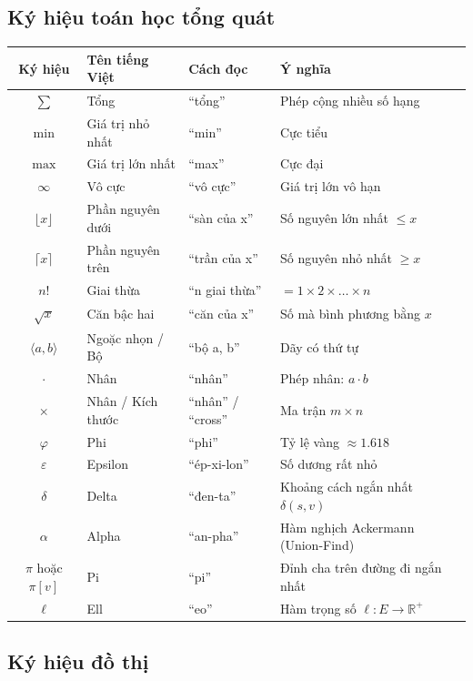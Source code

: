 \documentclass[10pt]{article}
\begin{document}
\subsection{Ký hiệu toán học tổng quát}

\begin{center}
\begin{tabular}{|c|l|l|l|}
\hline
\textbf{Ký hiệu} & \textbf{Tên tiếng Việt} & \textbf{Cách đọc} & \textbf{Ý nghĩa} \\
\hline
$\sum$ & Tổng & ``tổng'' & Phép cộng nhiều số hạng \\
\hline
$\min$ & Giá trị nhỏ nhất & ``min'' & Cực tiểu \\
\hline
$\max$ & Giá trị lớn nhất & ``max'' & Cực đại \\
\hline
$\infty$ & Vô cực & ``vô cực'' & Giá trị lớn vô hạn \\
\hline
$\lfloor x \rfloor$ & Phần nguyên dưới & ``sàn của x'' & Số nguyên lớn nhất $\leq x$ \\
\hline
$\lceil x \rceil$ & Phần nguyên trên & ``trần của x'' & Số nguyên nhỏ nhất $\geq x$ \\
\hline
$n!$ & Giai thừa & ``n giai thừa'' & $= 1 \times 2 \times \ldots \times n$ \\
\hline
$\sqrt{x}$ & Căn bậc hai & ``căn của x'' & Số mà bình phương bằng $x$ \\
\hline
$\langle a, b \rangle$ & Ngoặc nhọn / Bộ & ``bộ a, b'' & Dãy có thứ tự \\
\hline
$\cdot$ & Nhân & ``nhân'' & Phép nhân: $a \cdot b$ \\
\hline
$\times$ & Nhân / Kích thước & ``nhân'' / ``cross'' & Ma trận $m \times n$ \\
\hline
$\varphi$ & Phi & ``phi'' & Tỷ lệ vàng $\approx 1.618$ \\
\hline
$\varepsilon$ & Epsilon & ``ép-xi-lon'' & Số dương rất nhỏ \\
\hline
$\delta$ & Delta & ``đen-ta'' & Khoảng cách ngắn nhất $\delta(s,v)$ \\
\hline
$\alpha$ & Alpha & ``an-pha'' & Hàm nghịch Ackermann (Union-Find) \\
\hline
$\pi$ hoặc $\pi[v]$ & Pi & ``pi'' & Đỉnh cha trên đường đi ngắn nhất \\
\hline
$\ell$ & Ell & ``eo'' & Hàm trọng số $\ell: E \to \mathbb{R}^+$ \\
\hline
\end{tabular}
\end{center}

\subsection{Ký hiệu đồ thị}
\end{document}
